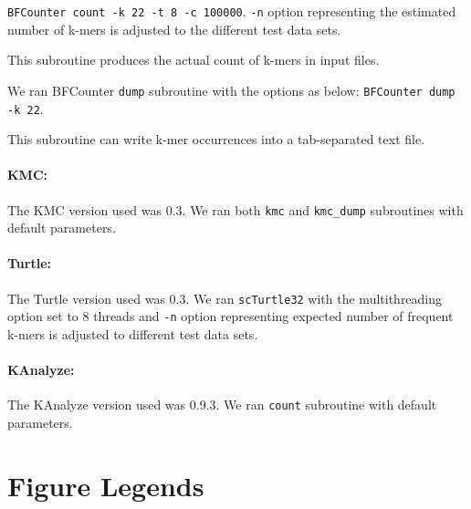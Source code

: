  {\tt BFCounter count -k 22 -t 8 -c 100000}.
 {\tt -n} option representing the estimated number of k-mers is adjusted to the different 
 test data sets.
 
 This subroutine produces the actual count of k-mers in input files.
 
We ran BFCounter {\tt dump} subroutine with the options as below:
 {\tt BFCounter dump -k 22}.
 
This subroutine can write k-mer occurrences into a tab-separated text file.

\paragraph{KMC:} The KMC version used was 0.3. We ran both {\tt kmc} and {\tt kmc\_dump} subroutines 
with default parameters.


\paragraph{Turtle:} The Turtle version used was 0.3. We ran {\tt scTurtle32} with the multithreading 
option set to 8 threads and {\tt -n} option representing expected number of frequent k-mers
is adjusted to different test data sets.

\paragraph{KAnalyze:} The KAnalyze version used was 0.9.3. We ran {\tt count} subroutine 
with default parameters.


 



\clearpage

\section*{Figure Legends}



